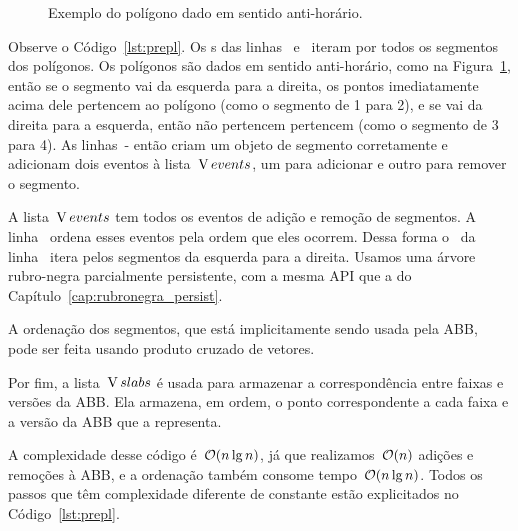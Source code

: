 \documentclass[main.tex]{subfiles}
\begin{document}
\begin{figure}
\centering
{}
\caption{Exemplo do polígono dado em sentido anti-horário.} \label{fig:exemplo_anti}
\end{figure}

Observe o Código~\ref{lst:prepl}. Os s das linhas~ e~ iteram por todos os segmentos dos polígonos. Os polígonos são dados em sentido anti-horário, como na Figura~\ref{fig:exemplo_anti}, então se o segmento vai da esquerda para a direita, os pontos imediatamente acima dele pertencem ao polígono (como o segmento de 1 para 2), e se vai da direita para a esquerda, então não pertencem pertencem (como o segmento de 3 para 4). As linhas~\mbox{-} então criam um objeto de segmento corretamente e adicionam dois eventos à lista~$\operatorname{V}{events}$, um para adicionar e outro para remover o segmento.

A lista~$\operatorname{V}{events}$ tem todos os eventos de adição e remoção de segmentos. A linha~ ordena esses eventos pela ordem que eles ocorrem. Dessa forma o~ da linha~ itera pelos segmentos da esquerda para a direita. Usamos uma árvore rubro-negra parcialmente persistente, com a mesma API que a do Capítulo~\ref{cap:rubronegra_persist}.

A ordenação dos segmentos, que está implicitamente sendo usada pela ABB, pode ser feita usando produto cruzado de vetores.

Por fim, a lista~$\operatorname{V}{slabs}$ é usada para armazenar a correspondência entre faixas e versões da ABB. Ela armazena, em ordem, o ponto correspondente a cada faixa e a versão da ABB que a representa.

A complexidade desse código é~$\mathcal{O}(n \lg n)$, já que realizamos~$\mathcal{O}(n)$ adições e remoções à ABB, e a ordenação também consome tempo~$\mathcal{O}(n \lg n)$. Todos os passos que têm complexidade diferente de constante estão explicitados no Código~\ref{lst:prepl}.
\end{document}
